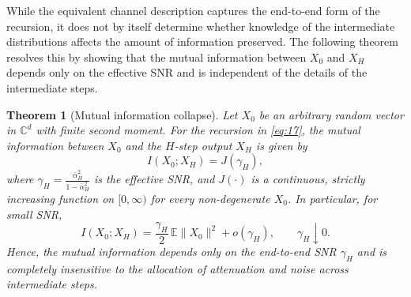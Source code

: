 \documentclass[journal]{IEEEtran}
\newtheorem{theorem}{Theorem}
\begin{document}
While the equivalent channel description captures the end-to-end form of the recursion, it does not by itself determine whether knowledge of the intermediate distributions affects the amount of information preserved. The following theorem resolves this by showing that the mutual information between $X_0$ and $X_H$ depends only on the effective SNR and is independent of the details of the intermediate steps.

\begin{theorem}[Mutual information collapse]\label{thm:MIcollapse}
Let $X_0$ be an arbitrary random vector in $\mathbb{C}^d$ with finite second moment. 
For the recursion in \eqref{eq:17}, the mutual information between $X_0$ and the $H$-step output $X_H$ is given by
\begin{equation}
    I(X_0;X_H) = J(\gamma_H),
\end{equation}
where $\gamma_H=\frac{\bar\alpha_H^2}{1-\bar\alpha_H^2}$ is the effective SNR, and $J(\cdot)$ is a continuous, strictly increasing function on $[0,\infty)$ for every non-degenerate $X_0$. 
In particular, for small SNR,
\begin{equation}
    I(X_0;X_H) = \frac{\gamma_H}{2}\,\mathbb{E}\|X_0\|^2 + o(\gamma_H), 
    \qquad \gamma_H \downarrow 0.
\end{equation}
Hence, the mutual information depends only on the end-to-end SNR $\gamma_H$ and is completely insensitive to the allocation of attenuation and noise across intermediate steps.
\end{theorem}
\end{document}

